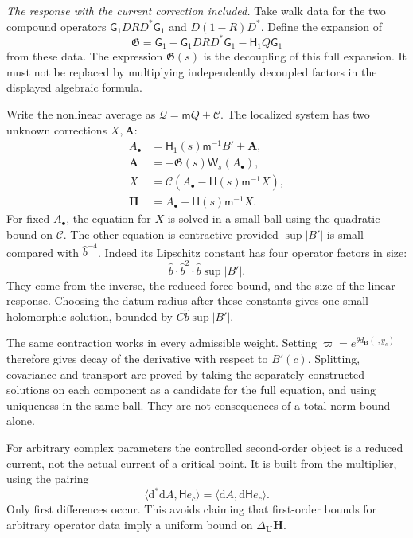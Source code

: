 \documentclass[11pt,letterpaper,reqno]{amsart}
\theoremstyle{definition}
\theoremstyle{remark}
\begin{document}
\emph{The response with the current correction included.}
Take walk data for the two compound operators
$\mathsf G_1DRD^*\mathsf G_1$ and
$D(1-R)D^*$. Define the expansion of
\[
 \mathfrak G=\mathsf G_1-\mathsf G_1DRD^*\mathsf G_1
                                      -\mathsf H_1Q\mathsf G_1
\]
from these data. The expression $\mathfrak G(s)$
is the decoupling of this full expansion. It
must not be replaced by multiplying independently
decoupled factors in the displayed algebraic
formula.

Write the nonlinear average as
$\mathcal Q=\mathsf mQ+\mathcal C$. The localized
system has two unknown corrections $X,\mathbf A$:
\[
 \begin{split}
 A_\bullet&=\mathsf H_1(s)\mathsf m^{-1}B'+\mathbf A,\\
 \mathbf A&=-\mathfrak G(s)\mathsf W_s(A_\bullet),\\
 X&=\mathcal C(A_\bullet-\mathsf H(s)\mathsf m^{-1}X),\\
 \mathbf H&=A_\bullet-\mathsf H(s)\mathsf m^{-1}X.
 \end{split}
\]
For fixed $A_\bullet$, the equation for $X$
is solved in a small ball using the quadratic
bound on $\mathcal C$. The other equation
is contractive provided $\sup|B'|$ is small
compared with $\widehat b^{-4}$. Indeed its
Lipschitz constant has four operator factors
in size:
\[
 \widehat b\cdot\widehat b^2\cdot
                       \widehat b\sup|B'|.
\]
They come from the inverse, the reduced-force
bound, and the size of the linear response.
Choosing the datum radius after these constants
gives one small holomorphic solution, bounded
by $C\widehat b\sup|B'|$.

The same contraction works in every admissible
weight. Setting
$\varpi=e^{\theta d_{\mathbf B}(\cdot,y_c)}$
therefore gives decay of the derivative with
respect to $B'(c)$. Splitting, covariance and
transport are proved by taking the separately
constructed solutions on each component as
a candidate for the full equation, and
using uniqueness in the same ball. They
are not consequences of a total norm bound
alone.

For arbitrary complex parameters the controlled
second-order object is a reduced current,
not the actual current of a critical point.
It is built from the multiplier, using the
pairing
\[
 \langle\mathrm d^*\mathrm d A,\mathsf He_c\rangle
                         =\langle\mathrm d A,\mathrm d\mathsf He_c\rangle.
\]
Only first differences occur. This avoids
claiming that first-order bounds for arbitrary
operator data imply a uniform bound on
$\Delta_{\mathbf U}\mathbf H$.
\end{document}
